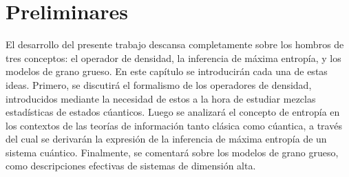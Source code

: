\chapter{Preliminares}
El desarrollo del presente trabajo descansa completamente sobre los hombros de tres conceptos: el operador de densidad, la inferencia de máxima entropía, y los modelos de grano grueso. En este capítulo se introducirán cada una de estas ideas. Primero, se discutirá el formalismo de los operadores de densidad, introducidos mediante la necesidad de estos a la hora de estudiar mezclas estadísticas de estados cúanticos. Luego se analizará el concepto de entropía en los contextos de las teorías de información tanto clásica como cúantica, a través del cual se derivarán la expresión de la inferencia de máxima entropía de un sistema cuántico. Finalmente, se comentará sobre los modelos de grano grueso, como descripciones efectivas de sistemas de dimensión alta.





\newpage